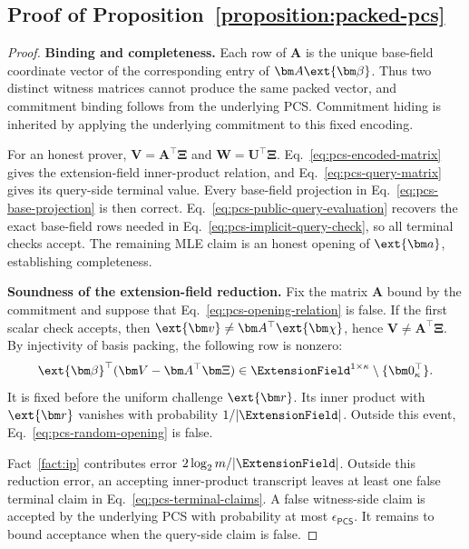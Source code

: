 \subsection{Proof of Proposition~\ref{proposition:packed-pcs}}
\label{appx:proof-pcs}

\begin{proof}
\noindent\textbf{Binding and completeness.}
Each row of \(\bm A\) is the unique base-field coordinate vector
of the corresponding entry of \(\bm A\ext{\bm\beta}\).
Thus two distinct witness matrices cannot produce the same packed
vector, and commitment binding follows from the underlying PCS.
Commitment hiding is inherited by applying the underlying commitment
to this fixed encoding.

For an honest prover,
\(\bm V=\bm A^\top\bm\Xi\) and
\(\bm W=\bm U^\top\bm\Xi\).
Eq.~\eqref{eq:pcs-encoded-matrix} gives the extension-field
inner-product relation, and Eq.~\eqref{eq:pcs-query-matrix} gives
its query-side terminal value.
Every base-field projection in Eq.~\eqref{eq:pcs-base-projection}
is then correct.
Eq.~\eqref{eq:pcs-public-query-evaluation} recovers the exact
base-field rows needed in Eq.~\eqref{eq:pcs-implicit-query-check},
so all terminal checks accept.
The remaining MLE claim is an honest opening of
\(\ext{\bm a}\), establishing completeness.

\noindent\textbf{Soundness of the extension-field reduction.}
Fix the matrix \(\bm A\) bound by the commitment and suppose that
Eq.~\eqref{eq:pcs-opening-relation} is false.
If the first scalar check accepts, then
\(\ext{\bm v}\neq\bm A^\top\ext{\bm\chi}\), hence
\(\bm V\neq\bm A^\top\bm\Xi\).
By injectivity of basis packing, the following row is nonzero:
\[
    \ext{\bm\beta}^{\top}
    (\bm V-\bm A^\top\bm\Xi)
    \in\ExtensionField^{1\times\kappa}\setminus\{\bm0_\kappa^\top\}.
\]
It is fixed before the uniform challenge \(\ext{\bm r}\).
Its inner product with \(\ext{\bm r}\) vanishes with probability
\(1/|\ExtensionField|\).
Outside this event, Eq.~\eqref{eq:pcs-random-opening} is false.

Fact~\ref{fact:ip} contributes error
\(2\log_2m/|\ExtensionField|\).
Outside this reduction error, an accepting inner-product transcript
leaves at least one false terminal claim in
Eq.~\eqref{eq:pcs-terminal-claims}.
A false witness-side claim is accepted by the underlying PCS with
probability at most \(\epsilon_{\mathsf{PCS}}\).
It remains to bound acceptance when the query-side claim is false.


\end{proof}
